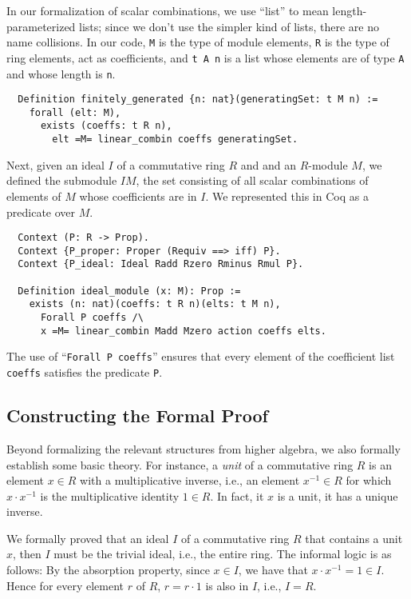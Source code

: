 \documentclass{article}
\begin{document}
In our formalization of scalar combinations, we use  ``list'' to mean
length-parameterized lists; since we don't use the simpler kind of lists, there
are no name collisions. In our code, \texttt{M} is the type of module elements,
\texttt{R} is the type of ring elements, act as coefficients, and
\texttt{t A n} is a list whose elements are of type \texttt{A} and whose length
is \texttt{n}.



\begin{verbatim}
  Definition finitely_generated {n: nat}(generatingSet: t M n) :=
    forall (elt: M),
      exists (coeffs: t R n),
        elt =M= linear_combin coeffs generatingSet.
\end{verbatim}

Next, given an ideal \(I\) of a commutative ring $R$ and and an $R$-module
\(M\),  we defined the submodule $IM$, the set consisting of all scalar
combinations of elements of \(M\) whose coefficients are in  \(I\). We
represented this in Coq as a predicate over \(M\).

\begin{verbatim}
  Context (P: R -> Prop).
  Context {P_proper: Proper (Requiv ==> iff) P}.
  Context {P_ideal: Ideal Radd Rzero Rminus Rmul P}.
  
  Definition ideal_module (x: M): Prop :=
    exists (n: nat)(coeffs: t R n)(elts: t M n),
      Forall P coeffs /\
      x =M= linear_combin Madd Mzero action coeffs elts.
\end{verbatim}

The use of  ``\verb|Forall P coeffs|'' ensures that every element of the
coefficient list \texttt{coeffs} satisfies the predicate \texttt{P}.  

\subsection{Constructing the Formal Proof}
Beyond formalizing the relevant structures from higher algebra, we also
formally establish some basic theory. For instance, a \emph{unit} of a
commutative ring $R$ is an element $x \in R$ with a multiplicative inverse,
i.e., an element $x^{-1} \in R$ for which $x \cdot x^{-1}$ is the
multiplicative identity $1 \in R$.  In fact, it $x$ is a unit, it has a unique  inverse. 
 
We formally proved that an ideal $I$ of a commutative ring $R$ that contains a
unit $x$, then $I$ must be the trivial ideal, i.e., the entire ring.  The
informal logic is as follows:  By the absorption property, since $x \in I$, we
have that $x \cdot x^{-1} = 1 \in I$.  Hence for every element $r$ of $R$,
$r = r \cdot 1$ is also in $I$, i.e., $I=R$. 
\end{document}
